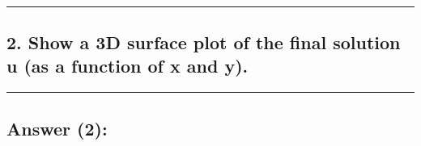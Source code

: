 \documentclass[11pt]{article}
\begin{document}
    \begin{center}
    \end{center}
    { \hspace*{\fill} \\}
    
    \begin{center}\rule{0.5\linewidth}{0.5pt}\end{center}

    \hypertarget{show-a-3d-surface-plot-of-the-final-solution-u-as-a-function-of-x-and-y.}{%
\subsection{2. Show a 3D surface plot of the final solution u (as a
function of x and
y).}\label{show-a-3d-surface-plot-of-the-final-solution-u-as-a-function-of-x-and-y.}}

    \begin{center}\rule{0.5\linewidth}{0.5pt}\end{center}

    \hypertarget{answer-2}{%
\subsection{Answer (2):}\label{answer-2}}
\end{document}
